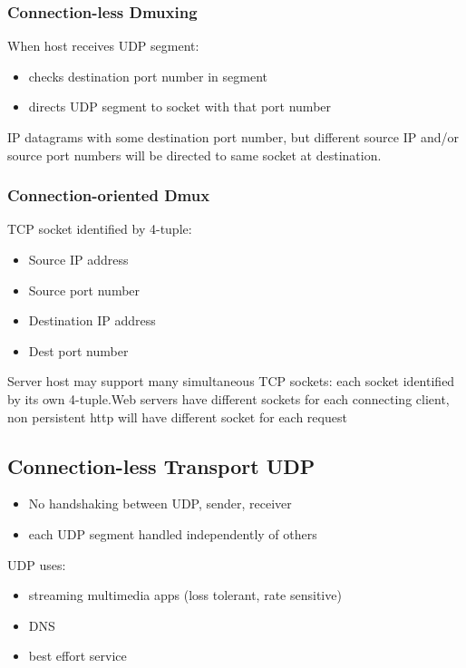\documentclass[11pt]{article}
\begin{document}
\subsubsection{Connection-less Dmuxing}
\label{sec:org6d00ac7}
When host receives UDP segment:
\begin{itemize}
\item checks destination port number in segment
\item directs UDP segment to socket with that port number
\end{itemize}

IP datagrams with some destination port number, but different source IP
and/or source port numbers will be directed to same socket at destination.

\subsubsection{Connection-oriented Dmux}
\label{sec:org33b788d}
TCP socket identified by 4-tuple:
\begin{itemize}
\item Source IP address
\item Source port number
\item Destination IP address
\item Dest port number
\end{itemize}

Server host may support many simultaneous TCP sockets: each socket
identified by its own 4-tuple.Web servers have different sockets for
each connecting client, non persistent http will have different socket
for each request

\subsection{Connection-less Transport UDP}
\label{sec:org2774d5e}
\begin{itemize}
\item No handshaking between UDP, sender, receiver
\item each UDP segment handled independently of others
\end{itemize}

UDP uses:
\begin{itemize}
\item streaming multimedia apps (loss tolerant, rate sensitive)
\item DNS
\item best effort service
\end{itemize}
\end{document}
